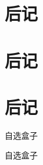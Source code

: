 \documentclass[color=BLUE]{textbook-cn}%
\begin{document}
\chapter*{后记}
\chapter*{后记}
\lipsum
\lipsum


\chapter{后记}
\lipsum
\lipsum



\begin{box6}{自选盒子}
\lipsum[2][1-3]
\end{box6}


\begin{TCBCODE}
\begin{box6}{自选盒子}
\lipsum[2][1-3]
\end{box6}
\end{TCBCODE}










%
\end{document}
